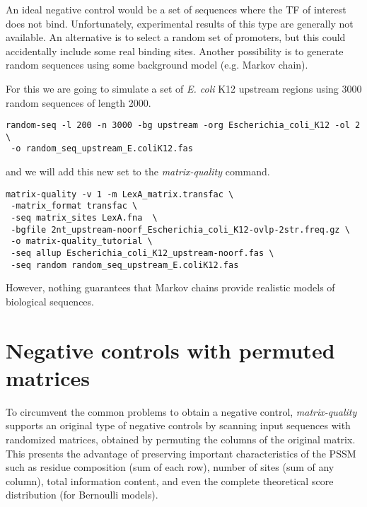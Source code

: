 An ideal negative control would be a set of sequences where the TF of
interest does not bind. Unfortunately, experimental results of this
type are generally not available. An alternative is to select a random
set of promoters, but this could accidentally include some real
binding sites. Another possibility is to generate random sequences
using some background model (e.g. Markov chain). 

For this we are going to simulate a set of \textit{E. coli} K12
upstream regions using 3000 random sequences of length 2000.


{\color{Blue} \begin{footnotesize} 
\begin{verbatim}
random-seq -l 200 -n 3000 -bg upstream -org Escherichia_coli_K12 -ol 2 \
 -o random_seq_upstream_E.coliK12.fas
\end{verbatim} \end{footnotesize}
}

and we will add this new set to the \textit{matrix-quality} command.

{\color{Blue} \begin{footnotesize}
\begin{verbatim}
matrix-quality -v 1 -m LexA_matrix.transfac \
 -matrix_format transfac \
 -seq matrix_sites LexA.fna  \
 -bgfile 2nt_upstream-noorf_Escherichia_coli_K12-ovlp-2str.freq.gz \
 -o matrix-quality_tutorial \
 -seq allup Escherichia_coli_K12_upstream-noorf.fas \
 -seq random random_seq_upstream_E.coliK12.fas
\end{verbatim} \end{footnotesize} }



However, nothing
guarantees that Markov chains provide realistic models of biological
sequences.



\section{Negative controls with permuted matrices}

To circumvent the common problems to obtain a negative control,\textit{ matrix-quality} supports an original type
of negative controls by scanning input sequences with randomized
matrices, obtained by permuting the columns of the original
matrix. This presents the advantage of preserving important
characteristics of the PSSM such as residue composition (sum of each
row), number of sites (sum of any column), total information content,
and even the complete theoretical score distribution (for Bernoulli
models).

